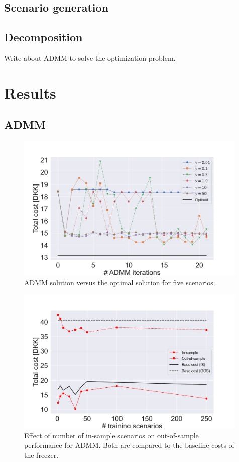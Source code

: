 \documentclass[11pt,a4paper]{article}
\begin{document}
\subsection{Scenario generation}

\subsection{Decomposition}

Write about ADMM to solve the optimization problem.


\section{Results}

\subsection{ADMM}

\begin{figure}[H]
    \centering
    \includegraphics[width=0.99\textwidth]{figures/admm_vs_normal_solution.png}
    \caption{ADMM solution versus the optimal solution for five scenarios.}
    \label{fig:admm_vs_normal_solution}
\end{figure}

\begin{figure}[H]
    \centering
    \includegraphics[width=0.99\textwidth]{figures/admm_nb_scenarios_effect.png}
    \caption{Effect of number of in-sample scenarios on out-of-sample performance for ADMM. Both are compared to the baseline costs of the freezer.}
    \label{fig:admm_nb_scenarios_effect}
\end{figure}
\end{document}
